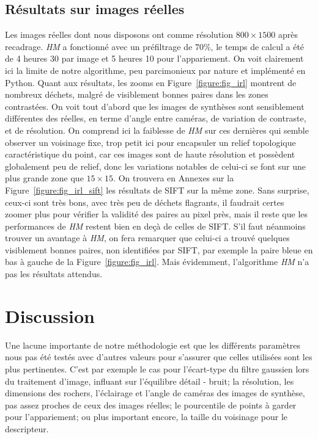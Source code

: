 \documentclass[
	a4paper, %
	10pt, %
	unnumberedsections, %
	twoside, %
]{LTJournalArticle}
\begin{document}
\subsection{Résultats sur images réelles}
Les images réelles dont nous disposons ont comme résolution $800 \times 1500$ après recadrage. \textit{HM} a fonctionné
avec un préfiltrage de $70 \%$, le temps de calcul a été de 4 heures 30 par image et 5 heures 10 pour l'appariement.
On voit clairement ici la limite de notre algorithme, peu parcimonieux par nature et implémenté en Python.
Quant aux résultats, les zooms en Figure~\ref{figure:fig_irl} montrent de nombreux déchets, malgré de visiblement
bonnes paires dans les zones contrastées.
On voit tout d'abord que les images de synthèses sont sensiblement différentes des réelles,
en terme d'angle entre caméras, de variation de contraste, et de résolution.
On comprend ici la faiblesse de \textit{HM} sur ces dernières qui semble observer un voisinage fixe,
trop petit ici pour encapsuler un relief topologique caractéristique du point,
car ces images sont de haute résolution et possèdent globalement peu de relief, donc les
variations notables de celui-ci se font sur une plus grande zone que $15 \times 15$.
On trouvera en Annexes sur la Figure~\ref{figure:fig_irl_sift} les résultats de SIFT sur la même zone.
Sans surprise, ceux-ci sont très bons, avec très peu de déchets flagrants, il faudrait certes zoomer plus
pour vérifier la validité des paires au pixel près, mais il reste que les performances de \textit{HM}
restent bien en deçà de celles de SIFT. S'il faut néanmoins trouver un avantage à \textit{HM}, on fera
remarquer que celui-ci a trouvé quelques visiblement bonnes paires, non identifiées par SIFT, par
exemple la paire bleue en bas à gauche de la Figure~\ref{figure:fig_irl}.
Mais évidemment, l'algorithme \textit{HM} n'a pas les résultats attendus.


\clearpage

\section{Discussion}

Une lacune importante de notre méthodologie est que les différents paramètres
nous pas été testés avec d'autres valeurs pour s'assurer que celles
utilisées sont les plus pertinentes.
C'est par exemple le cas pour l'écart-type du filtre gaussien
lors du traitement d'image, influant sur l'équilibre détail - bruit;
la résolution, les dimensions des rochers, l'éclairage et l'angle de caméras des images de synthèse,
pas assez proches de ceux des images réelles;
le pourcentile de points à garder pour l'appariement;
ou plus important encore, la taille du voisinage pour le descripteur.\\
\end{document}
